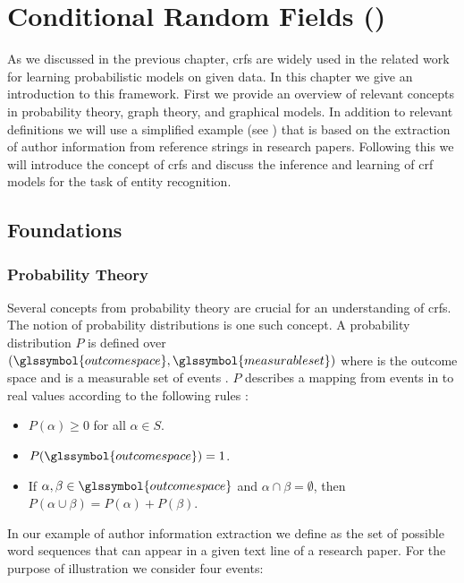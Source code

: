 \chapter{Conditional Random Fields ()}\label{cha:crfs}

As we discussed in the previous chapter, \glspl{crf} are widely used in the related work for learning probabilistic models on given data.
In this chapter we give an introduction to this framework.
First we provide an overview of relevant concepts in probability theory, graph theory, and graphical models.
In addition to relevant definitions we will use a simplified example (see ) that is based on the extraction of author information from reference strings in research papers.
Following this we will introduce the concept of \glspl{crf} and discuss the inference and learning of \gls{crf} models for the task of entity recognition.

\section{Foundations}\label{sec:foundations}
\subsection{Probability Theory}\label{subsec:probability-theory}
Several concepts from probability theory are crucial for an understanding of \glspl{crf}.
The notion of \glspl{probability distribution} is one such concept.
A \gls{probability distribution} $P$ is defined over $(\glssymbol{outcome space},\glssymbol{measurable set})$ where  is the \gls{outcome space} and  is a \gls{measurable set} of \glspl{event} \citep{koller2009probabilistic}.
$P$ describes a mapping from events in  to real values according to the following rules \citep{koller2009probabilistic}:
\begin{itemize}
  \item $P(\alpha)\geq 0 $ for all $ \alpha \in S$.
  \item $P(\glssymbol{outcome space})=1$.
  \item If $\alpha,\beta\in \glssymbol{outcome space}$ and $\alpha\cap\beta = \emptyset$, then $P(\alpha\cup\beta)=P(\alpha)+P(\beta)$.
\end{itemize}

In our example of author information extraction we define  as the set of possible word sequences that can appear in a given text line of a research paper.
For the purpose of illustration we consider four events:

